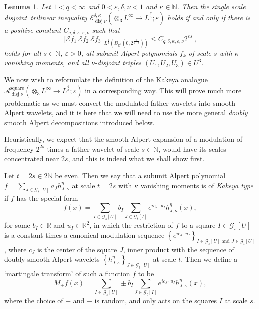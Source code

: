 \documentclass{amsart}%
\theoremstyle{plain}
\newtheorem{lemma}[theorem]{Lemma}
\numberwithin{equation}{section}
\begin{document}
\begin{lemma}
Let $1<q<\infty$ and $0<\varepsilon,\delta,\nu<1$ and $\kappa\in\mathbb{N}$.
Then the single scale disjoint\emph{\ }trilinear inequality $\mathcal{E}%
_{\operatorname*{disj}\nu}^{\delta,\kappa}\left(  \otimes_{3}L^{\infty
}\rightarrow L^{\frac{q}{3}};\varepsilon\right)  $ holds \emph{if and only if}
there is a positive constant $C_{q,\delta,\kappa,\varepsilon,\nu}$ such that%
\[
\left\Vert \mathcal{E}f_{1}\ \mathcal{E}f_{2}\ \mathcal{E}f_{3}\right\Vert
_{L^{\frac{q}{3}}\left(  B_{\mathbb{R}^{3}}\left(  0,2^{\frac{s}{1-\delta}%
}\right)  \right)  }\leq C_{q,\delta,\kappa,\varepsilon,\nu}2^{\varepsilon
s}\ ,
\]
holds for all $s\in\mathbb{N}$, $\varepsilon>0$, all subunit Alpert
polynomials $f_{k}$ of scale $s$ with $\kappa$ vanishing moments, and all
$\nu$-disjoint triples $\left(  U_{1},U_{2},U_{3}\right)  \in U^{3}$.
\end{lemma}

We now wish to reformulate the definition of the Kakeya analogue
$\mathcal{A}_{\operatorname*{disj}\nu}^{\operatorname*{square}}\left(
\otimes_{3}L^{\infty}\rightarrow L^{\frac{q}{3}};\varepsilon\right)  $ in a
corresponding way. This will prove much more problematic as we must convert
the modulated father wavelets into smooth Alpert wavelets, and it is here that
we will need to use the more general \emph{doubly} smooth Alpert
decompositions introduced below.

Heuristically, we expect that the smooth Alpert expansion of a modulation of
frequency $2^{2s}$ times a father wavelet of scale $s\in\mathbb{N}$, would
have its scales concentrated near $2s$, and this is indeed what we shall show first.

Let $t=2s\in2\mathbb{N}$ be even. Then we say that a subunit Alpert polynomial
$f=\sum_{J\in\mathcal{G}_{t}\left[  U\right]  }a_{J}h_{J;\kappa}^{\eta}$ at
scale $t=2s$ with $\kappa$ vanishing moments is of \emph{Kakeya type} if $f$
has the special form%
\begin{equation}
f\left(  x\right)  =\sum_{I\in\mathcal{G}_{s}\left[  U\right]  }b_{I}%
\sum_{J\in\mathcal{G}_{t}\left[  I\right]  }e^{ic_{J}\cdot u_{I}}h_{J;\kappa
}^{\eta}\left(  x\right)  ,\label{special}%
\end{equation}
for some $b_{I}\in\mathbb{R}$ and $u_{I}\in\mathbb{R}^{2}$, in which the
restriction of $f$ to a square $I\in\mathcal{G}_{s}\left[  U\right]  $ is a
constant times a canonical modulation sequence $\left\{  e^{ic_{J}\cdot u_{I}%
}\right\}  _{I\in\mathcal{G}_{s}\left[  U\right]  \text{ and }J\in
\mathcal{G}_{t}\left[  U\right]  }$, where $c_{J}$ is the center of the square
$J$, inner product with the sequence of doubly smooth Alpert wavelets
$\left\{  h_{J;\kappa}^{\eta}\right\}  _{J\in\mathcal{G}_{t}\left[  U\right]
} $ at scale $t$. Then we define a `martingale transform' of such a function
$f $ to be%
\[
M_{\pm}f\left(  x\right)  =\sum_{I\in\mathcal{G}_{s}\left[  U\right]  }\pm
b_{I}\sum_{J\in\mathcal{G}_{t}\left[  I\right]  }e^{ic_{J}\cdot u_{I}%
}h_{J;\kappa}^{\eta}\left(  x\right)  ,
\]
where the choice of $\mathcal{+}$ and $-$ is random, and only acts on the
squares $I$ at scale $s$.
\end{document}
